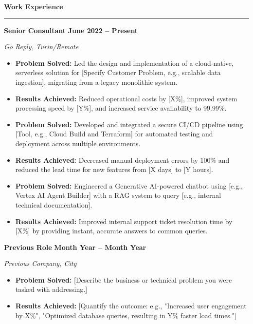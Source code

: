 \documentclass[10pt, a4paper]{article}
\newcommand{\cvsection}[1]{%
  \vspace{8pt} %
  \par %
  {\Large\bfseries\color{sectionblue}#1} %
  \par %
  \vspace{2pt} %
  \hrule %
  \vspace{6pt} %
}
\newcommand{\cvsubsection}[3]{%
  \par %
  {\large\bfseries #1} %
  \hfill %
  {\bfseries #2} %
  \par %
  {\textit{#3}} %
  \vspace{4pt} %
}
\begin{document}
\begin{minipage}[t]{0.68\textwidth}

\cvsection{Work Experience}

\cvsubsection
  {Senior Consultant} %
  {June 2022 -- Present} %
  {Go Reply, Turin/Remote} %

\begin{itemize}[leftmargin=*, nosep]
    \item \textbf{Problem Solved:} Led the design and implementation of a cloud-native, serverless solution for [Specify Customer Problem, e.g., scalable data ingestion], migrating from a legacy monolithic system.
    \item \textbf{Results Achieved:} Reduced operational costs by [X\%], improved system processing speed by [Y\%], and increased service availability to 99.99\%.
    \item \textbf{Problem Solved:} Developed and integrated a secure CI/CD pipeline using [Tool, e.g., Cloud Build and Terraform] for automated testing and deployment across multiple environments.
    \item \textbf{Results Achieved:} Decreased manual deployment errors by 100\% and reduced the lead time for new features from [X days] to [Y hours].
    \item \textbf{Problem Solved:} Engineered a Generative AI-powered chatbot using [e.g., Vertex AI Agent Builder] with a RAG system to query [e.g., internal technical documentation].
    \item \textbf{Results Achieved:} Improved internal support ticket resolution time by [X\%] by providing instant, accurate answers to common queries.
\end{itemize}

\vspace{6pt} %
\cvsubsection
  {Previous Role} %
  {Month Year -- Month Year} %
  {Previous Company, City} %

\begin{itemize}[leftmargin=*, nosep]
    \item \textbf{Problem Solved:} [Describe the business or technical problem you were tasked with addressing.]
    \item \textbf{Results Achieved:} [Quantify the outcome: e.g., "Increased user engagement by X\%", "Optimized database queries, resulting in Y\% faster load times."]
\end{itemize}


\end{minipage}
\end{document}

